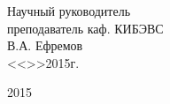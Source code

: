 \vfill

\begin{flushright}
\begin{minipage}{0.45\textwidth}
 \begin{flushleft}
  Научный руководитель \\
  преподаватель каф. КИБЭВС \\
  \underline{\hspace{3cm}}В.А. Ефремов \\
  <<\underline{\hspace{1cm}}>>\underline{\hspace{3cm}}2015г.\\
 \end{flushleft}
\end{minipage}
\end{flushright}

\vfill

\begin{center}
 2015
\end{center}
